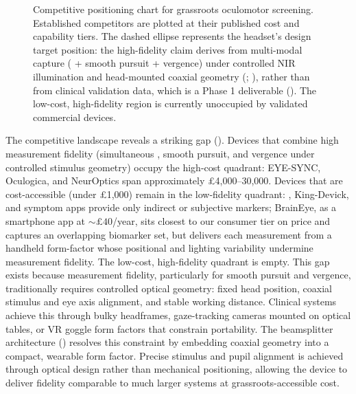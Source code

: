 \begin{figure}[htbp]
    \caption{Competitive positioning chart for grassroots  oculomotor screening. Established competitors are plotted at their published cost and capability tiers. The dashed ellipse represents the headset's design target position: the high-fidelity claim derives from multi-modal capture ( + smooth pursuit + vergence) under controlled NIR illumination and head-mounted coaxial geometry (; ), rather than from clinical validation data, which is a Phase 1 deliverable (). The low-cost, high-fidelity region is currently unoccupied by validated commercial devices.}
    \label{fig:ent-positioning-matrix}
\end{figure}

The competitive landscape reveals a striking gap (). Devices that combine high measurement fidelity (simultaneous , smooth pursuit, and vergence under controlled stimulus geometry) occupy the high-cost quadrant: EYE-SYNC, Oculogica, and NeurOptics span approximately \pounds 4{,}000--30{,}000. Devices that are cost-accessible (under \pounds 1{,}000) remain in the low-fidelity quadrant: , King-Devick, and symptom apps provide only indirect or subjective markers; BrainEye, as a smartphone app at ${\sim}\pounds 40$/year, sits closest to our consumer tier on price and captures an overlapping biomarker set, but delivers each measurement from a handheld form-factor whose positional and lighting variability undermine measurement fidelity. The low-cost, high-fidelity quadrant is empty. This gap exists because measurement fidelity, particularly for smooth pursuit and vergence, traditionally requires controlled optical geometry: fixed head position, coaxial stimulus and eye axis alignment, and stable working distance. Clinical systems achieve this through bulky headframes, gaze-tracking cameras mounted on optical tables, or VR goggle form factors that constrain portability. The beamsplitter architecture () resolves this constraint by embedding coaxial geometry into a compact, wearable form factor. Precise stimulus and pupil alignment is achieved through optical design rather than mechanical positioning, allowing the device to deliver fidelity comparable to much larger systems at grassroots-accessible cost.


